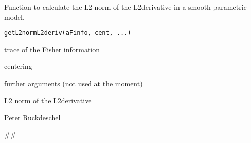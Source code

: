 \begin{Description}\relax
Function to calculate the L2 norm of the L2derivative in a smooth parametric model.
\end{Description}
\begin{Usage}
\begin{verbatim}getL2normL2deriv(aFinfo, cent, ...)\end{verbatim}
\end{Usage}
\begin{Arguments}
\begin{ldescription}
\item[\code{aFinfo}] trace of the Fisher information
\item[\code{cent}] centering
\item[\code{...}] further arguments (not used at the moment)
\end{ldescription}
\end{Arguments}
\begin{Value}
L2 norm of the L2derivative
\end{Value}
\begin{Author}\relax
Peter Ruckdeschel 
\end{Author}
\begin{Examples}
\begin{ExampleCode}
##
\end{ExampleCode}
\end{Examples}

